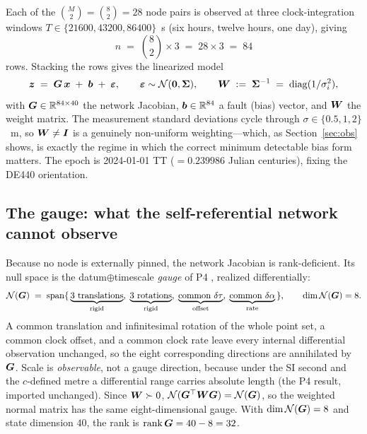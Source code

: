 Each of the $\binom{M}{2}=\binom{8}{2}=28$ node pairs is observed at three clock-integration
windows $T\in\{21600,43200,86400\}$~s (six hours, twelve hours, one day), giving
\begin{equation}
  n \;=\; \binom{8}{2}\times 3 \;=\; 28\times 3 \;=\; 84
  \label{eq:nrows}
\end{equation}
rows. Stacking the rows gives the linearized model
\begin{equation}
  \bm z \;=\; \bm{G}\,\bm{x} \;+\; \bm{b} \;+\; \bm\varepsilon,
  \qquad
  \bm\varepsilon\sim\mathcal N(\bm 0,\bm{\Sigma}),
  \qquad
  \bm{W} \;:=\; \bm{\Sigma}^{-1}\;=\;\operatorname{diag}(1/\sigma_i^2),
  \label{eq:model}
\end{equation}
with $\bm{G}\in\mathbb{R}^{84\times 40}$ the network Jacobian, $\bm{b}\in\mathbb{R}^{84}$ a fault (bias)
vector, and $\bm{W}$ the weight matrix. The measurement standard deviations cycle through
$\sigma\in\{0.5,1,2\}$~m, so $\bm{W}\neq\bm{I}$ is a genuinely non-uniform weighting---which,
as Section~\ref{sec:obs} shows, is exactly the regime in which the correct minimum
detectable bias form matters. The epoch is 2024-01-01 TT (${}=0.239986$
Julian centuries), fixing the DE440 orientation.

\subsection{The gauge: what the self-referential network cannot observe}
\label{sec:gauge}

Because no node is externally pinned, the network Jacobian is rank-deficient. Its null space
is the datum$\oplus$timescale \emph{gauge} of P4 \citep{baweja2026gauge}, realized
differentially:
\begin{equation}
  \mathcal{N}(\bm{G})
  \;=\;\operatorname{span}\{\,
    \underbrace{3\text{ translations}}_{\text{rigid}},\;
    \underbrace{3\text{ rotations}}_{\text{rigid}},\;
    \underbrace{\text{common }\delta\tau}_{\text{offset}},\;
    \underbrace{\text{common }\delta\alpha}_{\text{rate}}\,\},
  \qquad \dim\mathcal{N}(\bm{G})=8 .
  \label{eq:gauge}
\end{equation}
A common translation and infinitesimal rotation of the whole point set, a common clock
offset, and a common clock rate leave every internal differential observation unchanged, so
the eight corresponding directions are annihilated by $\bm{G}$. Scale is \emph{observable},
not a gauge direction, because under the SI second and the $c$-defined metre a differential
range carries absolute length (the P4 result, imported unchanged). Since $\bm{W}\succ0$,
$\mathcal{N}(\bm{G}^\top\bm{W}\bm{G})=\mathcal{N}(\bm{G})$, so the weighted normal matrix has the same
eight-dimensional gauge. With $\dim\mathcal{N}(\bm{G})=8$ and state dimension $40$, the rank is
$\operatorname{rank}\bm{G}=40-8=32$.


